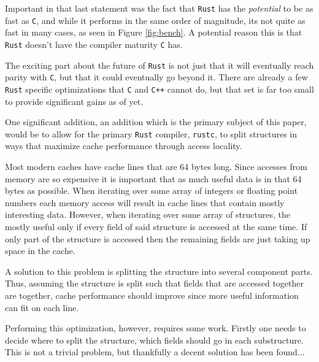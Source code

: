 \documentclass[12pt,oneside]{book}
\newcommand{\rustname}{{\texttt{Rust}}}
\def \rust {\rustname{}\xspace}
\newcommand{\rustcname}{{\texttt{rustc}}}
\def \rustc {\rustcname{}\xspace}
\newcommand{\cname}{{\texttt{C}}}
\def \c {\cname{}\xspace}
\newcommand{\cppname}{{\texttt{C++}}}
\def \cpp {\cppname{}\xspace}
\begin{document}
Important in that last statement was the fact that \rust has the \textit{potential}
to be as fast as \c, and while it performs in the same order of magnitude, its not
quite as fast in many cases, as seen in Figure \ref{fig:bench}.
A potential reason this is that \rust doesn't have the compiler maturity \c has.

The exciting part about the future of \rust is not just that it will eventually
reach parity with \c, but that it could eventually go beyond it. There are
already a few \rust specific optimizations that \c and \cpp cannot do, but that
set is far too small to provide significant gains as of yet.


One significant addition, an addition which is the primary subject of this
paper, would be to allow for the primary \rust compiler, \rustc, to split
structures in ways that maximize cache performance through access locality.

Most modern caches have cache lines that are 64 bytes long. Since accesses from
memory are so expensive it is important that as much useful data is in that 64
bytes as possible. When iterating over some array of integers or floating point
numbers each memory access will result in cache lines that contain mostly
interesting data. However, when iterating over some array of structures,
the mostly useful only
if every field of said structure is accessed at the same time. If only part of
the structure is accessed then the remaining fields are just taking up space in
the cache.

A solution to this problem is splitting the structure into several component
parts. Thus, assuming the structure is split such that fields that are accessed
together are together, cache performance should improve since more useful 
information can fit on each line.

Performing this optimization, however, requires some work. Firstly one
needs to decide where to split the structure, which fields should go in
each substructure. This is not a trivial problem, but thankfully a decent
solution has been found...

\end{document}
